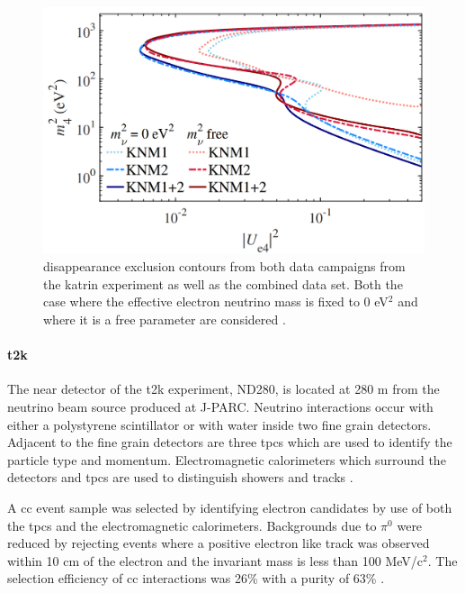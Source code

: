 \begin{figure}[h!]
    \centering
    \includegraphics[width = \largefigwidth]{figures-chap2/KATRIN_exclusion_contours.png}
    \caption[\nue disappearance exclusion contours from the \gls{katrin} experiment.]{\nue disappearance exclusion contours from both data campaigns from the \gls{katrin} experiment as well as the combined data set. Both the case where the effective electron neutrino mass is fixed to 0 eV$^2$ and where it is a free parameter are considered \cite{KATRIN_sterile_neutrino_results}.}
    \label{fig:katrin_exclusion_contour}
\end{figure}


\paragraph{\gls{t2k}}
The near detector of the \gls{t2k} experiment, ND280, is located at 280 m from the neutrino beam source produced at J-PARC. Neutrino interactions occur with either a polystyrene scintillator or with water inside two fine grain detectors. Adjacent to the fine grain detectors are three \glspl{tpc} which are used to identify the particle type and momentum. Electromagnetic calorimeters which surround the detectors and \glspl{tpc} are used to distinguish showers and tracks \cite{T2K_nue_disapp_contour}. 

A \nue \gls{cc} event sample was selected by identifying electron candidates by use of both the \glspl{tpc} and the electromagnetic calorimeters. Backgrounds due to $\pi^0$ were reduced by rejecting events where a positive electron like track was observed within 10 cm of the electron and the \positron\electron invariant mass is less than 100 MeV/c$^2$. The selection efficiency of \nue \gls{cc} interactions was 26\% with a purity of 63\% \cite{T2K_nue_disapp_contour}. 

